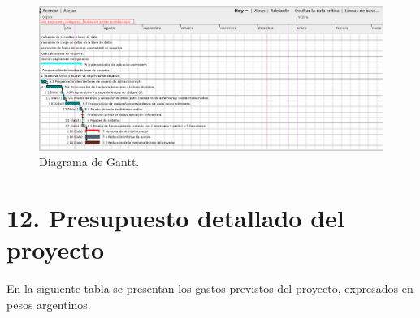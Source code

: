 \documentclass[
11pt, %
]{charter}
\begin{document}
\newpage
\begin{landscape}
\begin{figure}[htpb]
\centering 
\includegraphics[height=.65\textheight]{./Figuras/planning3.png}
\caption{Diagrama de Gantt.}
\label{fig:diagGantt2}
\end{figure}

\end{landscape}

\section{12. Presupuesto detallado del proyecto}
\label{sec:presupuesto}




En la siguiente tabla se presentan los gastos previstos del proyecto, expresados en pesos argentinos.
\end{document}

